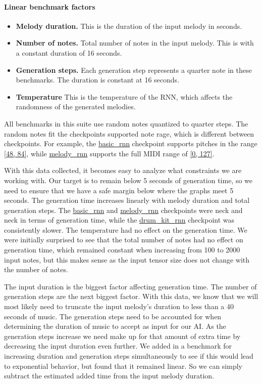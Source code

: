 \paragraph{Linear benchmark factors}
\begin{itemize}
  \item \textbf{Melody duration.} This is the duration of the input melody in seconds.
  \item \textbf{Number of notes.} Total number of notes in the input melody. This is with
        a constant duration of 16 seconds.
  \item \textbf{Generation steps.} Each generation step represents a quarter note in these
        benchmarks. The duration is constant at 16 seconds.
  \item \textbf{Temperature} This is the temperature of the RNN, which affects the
        randomness of the generated melodies.
\end{itemize}

All benchmarks in this suite use random notes quantized to quarter steps. The random notes
fit the checkpoints supported note rage, which is different between checkpoints. For
example, the \url{basic_rnn} checkpoint supports pitches in the range \url{[48, 84]},
while \url{melody_rnn} supports the full MIDI range of \url{[0, 127]}.

With this data collected, it becomes easy to analyze what constraints we are working
with. Our target is to remain below 5 seconds of generation time, so we need to ensure
that we have a safe margin below where the graphs meet 5 seconds. The generation time
increases linearly with melody duration and total generation steps. The \url{basic_rnn}
and \url{melody_rnn} checkpoints were neck and neck in terms of generation time, while the
\url{drum_kit_rnn} checkpoint was consistently slower. The temperature had no effect on
the generation time. We were initially surprised to see that the total number of notes had
no effect on generation time, which remained constant when increasing from 100 to 2000
input notes, but this makes sense as the input tensor size does not change with the number
of notes.

The input duration is the biggest factor affecting generation time. The number of
generation steps are the next biggest factor. With this data, we know that we will most
likely need to truncate the input melody's duration to less than a 40 seconds of music.
The generation steps need to be accounted for when determining the duration of music to
accept as input for our AI. As the generation steps increase we need make up for that
amount of extra time by decreasing the input duration even further. We added in a
benchmark for increasing duration and generation steps simultaneously to see if this would
lead to exponential behavior, but found that it remained linear. So we can simply subtract
the estimated added time from the input melody duration.

